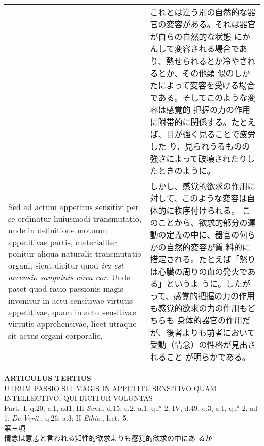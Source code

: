 \documentclass[10pt]{jsarticle} %
\begin{document}
\begin{longtable}{p{21em}p{21em}}
&

これとは違う別の自然的な器官の変容がある。それは器官が自らの自然的な状態
 にかんして変容される場合であり、熱せられるとか冷やされるとか、その他類
 似のしかたによって変容を受ける場合である。そしてこのような変容は感覚的
 把握の力の作用に附帯的に関係する。たとえば、目が強く見ることで疲労した
 り、見られうるものの強さによって破壊されたりしたときのように。


\\



Sed ad actum appetitus sensitivi per se
 ordinatur huiusmodi transmutatio, unde in definitione motuum
 appetitivae partis, materialiter ponitur aliqua naturalis transmutatio
 organi; sicut dicitur quod {\itshape ira est accensio sanguinis circa cor}. Unde
 patet quod ratio passionis magis invenitur in actu sensitivae virtutis
 appetitivae, quam in actu sensitivae virtutis apprehensivae, licet
 utraque sit actus organi corporalis.


&


しかし、感覚的欲求の作用に対して、このような変容は自体的に秩序付けられる。
このことから、欲求的部分の運動の定義の中に、器官の何らかの自然的変容が質
 料的に措定される。たとえば「怒りは心臓の周りの血の発火である」というよ
 うに。したがって、感覚的把握の力の作用も感覚的欲求の力の作用もどちらも
 身体的器官の作用だが、後者よりも前者において受動（情念）の性格が見出されること
 が明らかである。

\end{longtable}
\newpage


\begin{center}
 {\Large {\bf ARTICULUS TERTIUS}}\\
 {\large UTRUM PASSIO SIT MAGIS IN APPETITU SENSITIVO QUAM
 INTELLECTIVO, QUI DICITUR VOLUNTAS}\\
 {\footnotesize Part.~I, q.20, a.1, ad1; III {\itshape Sent.}, d.15,
 q.2, a.1, qu$^a$ 2; IV, d.49, q.3, a.1, qu$^a$ 2, ad 1; {\itshape De
 Verit.}, q.26, a.3; II {\itshape Ethic.}, lect.~5.}\\
 {\Large 第三項\\情念は意志と言われる知性的欲求よりも感覚的欲求の中にあ
 るか}
\end{center}
\end{document}
